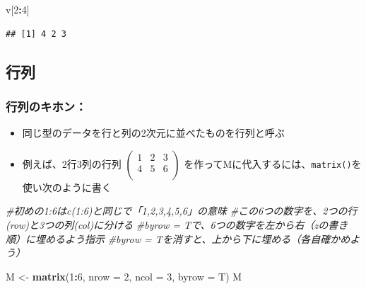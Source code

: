 \documentclass[
]{book}
\newenvironment{Shaded}{\begin{snugshade}}{\end{snugshade}}
\newcommand{\AttributeTok}[1]{\textcolor[rgb]{0.13,0.29,0.53}{#1}}
\newcommand{\CommentTok}[1]{\textcolor[rgb]{0.56,0.35,0.01}{\textit{#1}}}
\newcommand{\DecValTok}[1]{\textcolor[rgb]{0.00,0.00,0.81}{#1}}
\newcommand{\FunctionTok}[1]{\textcolor[rgb]{0.13,0.29,0.53}{\textbf{#1}}}
\newcommand{\NormalTok}[1]{#1}
\newcommand{\OtherTok}[1]{\textcolor[rgb]{0.56,0.35,0.01}{#1}}
\newcommand{\SpecialCharTok}[1]{\textcolor[rgb]{0.81,0.36,0.00}{\textbf{#1}}}
\providecommand{\tightlist}{%
  \setlength{\itemsep}{0pt}\setlength{\parskip}{0pt}}
\begin{document}
\begin{Shaded}
\begin{Highlighting}[]
\NormalTok{v[}\DecValTok{2}\SpecialCharTok{:}\DecValTok{4}\NormalTok{]}
\end{Highlighting}
\end{Shaded}

\begin{verbatim}
## [1] 4 2 3
\end{verbatim}

\hypertarget{ux884cux5217}{%
\subsection{行列}\label{ux884cux5217}}

\hypertarget{ux884cux5217ux306eux30adux30dbux30f3}{%
\subsubsection*{行列のキホン：}\label{ux884cux5217ux306eux30adux30dbux30f3}}

\begin{itemize}
\tightlist
\item
  同じ型のデータを行と列の2次元に並べたものを行列と呼ぶ
\item
  例えば、2行3列の行列
  \(\begin{pmatrix} 1 & 2 & 3 \\ 4 & 5 & 6 \\ \end{pmatrix}\)
  を作ってMに代入するには、\texttt{matrix()}を使い次のように書く
\end{itemize}

\begin{Shaded}
\begin{Highlighting}[]
\CommentTok{\#初めの1:6はc(1:6)と同じで「1,2,3,4,5,6」の意味}
\CommentTok{\#この6つの数字を、2つの行(row)と3つの列(col)に分ける}
\CommentTok{\#byrow = Tで、6つの数字を左から右（zの書き順）に埋めるよう指示}
\CommentTok{\#byrow = Tを消すと、上から下に埋める（各自確かめよう）}

\NormalTok{M }\OtherTok{\textless{}{-}} \FunctionTok{matrix}\NormalTok{(}\DecValTok{1}\SpecialCharTok{:}\DecValTok{6}\NormalTok{, }\AttributeTok{nrow =} \DecValTok{2}\NormalTok{, }\AttributeTok{ncol =} \DecValTok{3}\NormalTok{, }\AttributeTok{byrow =}\NormalTok{ T)}
\NormalTok{M}
\end{Highlighting}
\end{Shaded}
\end{document}
